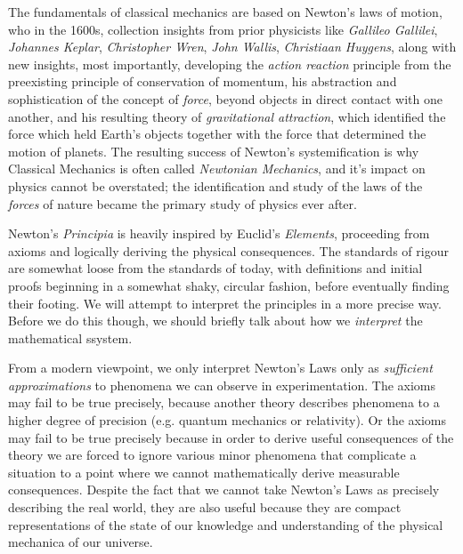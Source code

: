 The fundamentals of classical mechanics are based on Newton's laws of motion, who in the 1600s, collection insights from prior physicists like \emph{Gallileo Gallilei}, \emph{Johannes Keplar}, \emph{Christopher Wren}, \emph{John Wallis}, \emph{Christiaan Huygens}, along with new insights, most importantly, developing the \emph{action reaction} principle from the preexisting principle of conservation of momentum, his abstraction and sophistication of the concept of \emph{force}, beyond objects in direct contact with one another, and his resulting theory of \emph{gravitational attraction}, which identified the force which held Earth's objects together with the force that determined the motion of planets. The resulting success of Newton's  systemification is why Classical Mechanics is often called \emph{Newtonian Mechanics}, and it's impact on physics cannot be overstated; the identification and study of the laws of the \emph{forces} of nature became the primary study of physics ever after.

Newton's \emph{Principia} is heavily inspired by Euclid's \emph{Elements}, proceeding from axioms and logically deriving the physical consequences. The standards of rigour are somewhat loose from the standards of today, with definitions and initial proofs beginning in a somewhat shaky, circular fashion, before eventually finding their footing. We will attempt to interpret the principles in a more precise way. Before we do this though, we should briefly talk about how we \emph{interpret} the mathematical ssystem.

From a modern viewpoint, we only interpret Newton's Laws only as \emph{sufficient approximations} to phenomena we can observe in experimentation. The axioms may fail to be true precisely, because another theory describes phenomena to a higher degree of precision (e.g. quantum mechanics or relativity). Or the axioms may fail to be true precisely because in order to derive useful consequences of the theory we are forced to ignore various minor phenomena that complicate a situation to a point where we cannot mathematically derive measurable consequences. Despite the fact that we cannot take Newton's Laws as precisely describing the real world, they are also useful because they are compact representations of the state of our knowledge and understanding of the physical mechanica of our universe.

